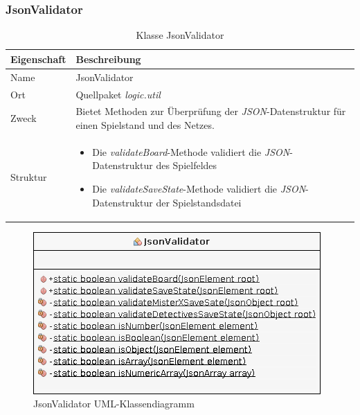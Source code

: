     \subsubsection{JsonValidator}
        \begin{table}[H]
            \caption{Klasse JsonValidator}
            \begin{tabular}{p{2.5cm}  p{9.5cm}} 
                \hline
                \textbf{Eigenschaft} & \textbf{Beschreibung}\\
                \hline
                Name & JsonValidator\\
                Ort & Quellpaket \textit{logic.util}\\
                \hline
                Zweck &
                Bietet Methoden zur Überprüfung der \textit{JSON}-Datenstruktur für einen Spielstand und des Netzes.
                \\
                \hline
                Struktur &
                \begin{itemize}
                    \itemsep0em
                    \item Die \textit{validateBoard}-Methode validiert die \textit{JSON}-Datenstruktur des Spielfeldes
                    \item Die \textit{validateSaveState}-Methode validiert die \textit{JSON}-Datenstruktur der Spielstandsdatei
                \end{itemize}
                \\
                \hline
            \end{tabular}
        \end{table}
        \begin{figure}[H]
            \centering
            \includegraphics[scale=0.7]{img/uml/jsonValidator.png}   
            \caption{JsonValidator UML-Klassendiagramm}
        \end{figure}

